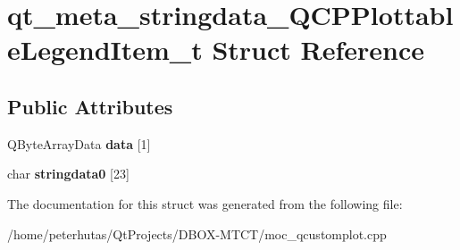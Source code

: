 \hypertarget{structqt__meta__stringdata___q_c_p_plottable_legend_item__t}{}\section{qt\+\_\+meta\+\_\+stringdata\+\_\+\+Q\+C\+P\+Plottable\+Legend\+Item\+\_\+t Struct Reference}
\label{structqt__meta__stringdata___q_c_p_plottable_legend_item__t}
\subsection*{Public Attributes}
\begin{DoxyCompactItemize}
\item 
\mbox{\label{structqt__meta__stringdata___q_c_p_plottable_legend_item__t_a56d928faacdea012d9b501b879ef98a8}} 
Q\+Byte\+Array\+Data {\bfseries data} \mbox{[}1\mbox{]}
\item 
\mbox{\label{structqt__meta__stringdata___q_c_p_plottable_legend_item__t_a2add548f134b64b363d6ee1b2125da1d}} 
char {\bfseries stringdata0} \mbox{[}23\mbox{]}
\end{DoxyCompactItemize}


The documentation for this struct was generated from the following file\+:\begin{DoxyCompactItemize}
\item 
/home/peterhutas/\+Qt\+Projects/\+D\+B\+O\+X-\/\+M\+T\+C\+T/moc\+\_\+qcustomplot.\+cpp\end{DoxyCompactItemize}
